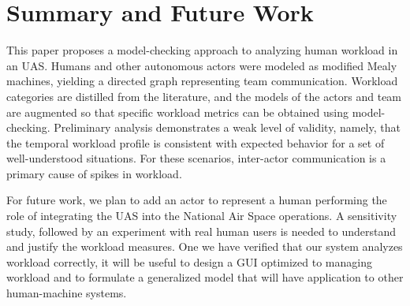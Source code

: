 \section{Summary and Future Work}
This paper proposes a model-checking approach to analyzing human workload in an UAS.  Humans and other autonomous actors were modeled as modified Mealy machines, yielding a directed graph representing team communication.  Workload categories are distilled from the literature, and the models of the actors and team are augmented so that specific workload metrics can be obtained using model-checking.  Preliminary analysis demonstrates a weak level of validity, namely, that the temporal workload profile is consistent with expected behavior for a set of well-understood situations.  For these scenarios, inter-actor communication is a primary cause of spikes in workload. 

For future work, we plan to add an actor to represent a human performing the role of integrating the UAS into the National Air Space operations. A sensitivity study, followed by an experiment with real human users is needed to understand and justify the workload measures. One we have verified that our system analyzes workload correctly, it will be useful to design a GUI optimized to managing workload and to formulate a generalized model that will have application to other human-machine systems.

